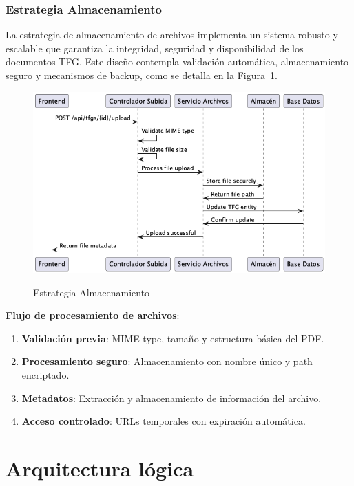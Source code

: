 \documentclass[12pt,a4paper,oneside]{report}
\providecommand{\tightlist}{%
  \setlength{\itemsep}{0pt}\setlength{\parskip}{0pt}}
\providecommand{\pandocbounded}[1]{#1}
\begin{document}
\subsubsection{Estrategia
Almacenamiento}\label{estrategia-almacenamiento}

La estrategia de almacenamiento de archivos implementa un sistema robusto y escalable que garantiza la integridad, seguridad y disponibilidad de los documentos TFG. Este diseño contempla validación automática, almacenamiento seguro y mecanismos de backup, como se detalla en la Figura~\ref{fig:estrategia-almacenamiento}.

\begin{figure}[H]
\centering
\pandocbounded{\includegraphics[keepaspectratio,alt={Estrategia Almacenamiento}]{processed/images/05_diseno_plantuml_2.png}}
\caption{Estrategia Almacenamiento}
\label{fig:estrategia-almacenamiento}
\end{figure}

\textbf{Flujo de procesamiento de archivos}:

\begin{enumerate}
\def\labelenumi{\arabic{enumi}.}
\tightlist
\item
  \textbf{Validación previa}: MIME type, tamaño y estructura básica del
  PDF.
\item
  \textbf{Procesamiento seguro}: Almacenamiento con nombre único y path
  encriptado.
\item
  \textbf{Metadatos}: Extracción y almacenamiento de información del
  archivo.
\item
  \textbf{Acceso controlado}: URLs temporales con expiración automática.
\end{enumerate}

\section{Arquitectura lógica}\label{arquitectura-luxf3gica}
\end{document}
